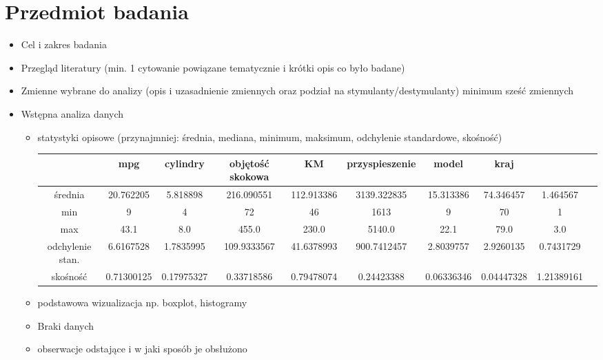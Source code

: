 \documentclass{article}
\begin{document}
\section{Przedmiot badania}
    \begin{itemize}
        \item Cel i zakres badania
        \item Przegląd literatury (min. 1 cytowanie powiązane tematycznie i krótki opis co było badane)
        \item Zmienne wybrane do analizy (opis i uzasadnienie zmiennych oraz podział na stymulanty/destymulanty) minimum sześć zmiennych
        \item Wstępna analiza danych
        \begin{itemize}
            \item statystyki opisowe (przynajmniej: średnia, mediana, minimum, maksimum, odchylenie standardowe, skośność)
                \begin{center}
                    \begin{tabular}{ |c|c|c|c|c|c|c|c|c|c| } 
                        \hline
                        & mpg & cylindry & objętość skokowa & KM & przyspieszenie & model & kraj \\
                        \hline
                        średnia & 20.762205  & 5.818898 & 216.090551 & 112.913386 & 3139.322835 & 15.313386 & 74.346457 & 1.464567 \\
                        \hline
                        min & 9 & 4 & 72 & 46 & 1613 & 9 & 70 & 1  \\
                        \hline
                        max & 43.1 & 8.0 & 455.0 & 230.0 & 5140.0 & 22.1 & 79.0 &  3.0  \\
                        \hline
                        odchylenie stan. & 6.6167528 & 1.7835995 & 109.9333567 & 41.6378993 & 900.7412457 & 2.8039757 & 2.9260135 &  0.7431729  \\
                        \hline
                        skośność & 0.71300125 & 0.17975327 & 0.33718586 & 0.79478074 & 0.24423388 & 0.06336346 & 0.04447328 &  1.21389161 \\
                    \hline
                    \end{tabular}
                \end{center}
            \item podstawowa wizualizacja np. boxplot, histogramy
            \item Braki danych
            \item obserwacje odstające i w jaki sposób je obsłużono
        \end{itemize}
    \end{itemize}
\end{document}
